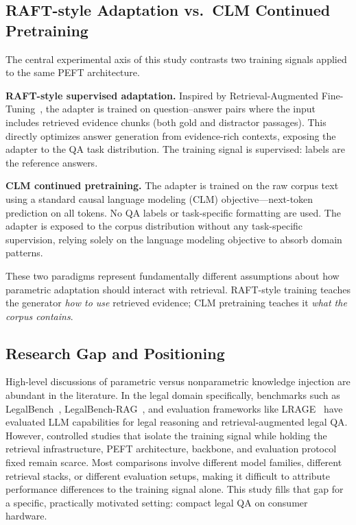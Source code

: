 \subsection{RAFT-style Adaptation vs.\ CLM Continued Pretraining}

The central experimental axis of this study contrasts two training signals applied to the same PEFT architecture.

\textbf{RAFT-style supervised adaptation.} Inspired by Retrieval-Augmented Fine-Tuning~\cite{zhang2024raft}, the adapter is trained on question--answer pairs where the input includes retrieved evidence chunks (both gold and distractor passages). This directly optimizes answer generation from evidence-rich contexts, exposing the adapter to the QA task distribution. The training signal is supervised: labels are the reference answers.

\textbf{CLM continued pretraining.} The adapter is trained on the raw corpus text using a standard causal language modeling (CLM) objective---next-token prediction on all tokens. No QA labels or task-specific formatting are used. The adapter is exposed to the corpus distribution without any task-specific supervision, relying solely on the language modeling objective to absorb domain patterns.

These two paradigms represent fundamentally different assumptions about how parametric adaptation should interact with retrieval. RAFT-style training teaches the generator \emph{how to use} retrieved evidence; CLM pretraining teaches it \emph{what the corpus contains}.

\subsection{Research Gap and Positioning}

High-level discussions of parametric versus nonparametric knowledge injection are abundant in the literature. In the legal domain specifically, benchmarks such as LegalBench~\cite{guha2023legalbench}, LegalBench-RAG~\cite{pipitone2024legalbenchrag}, and evaluation frameworks like LRAGE~\cite{park2025lrage} have evaluated LLM capabilities for legal reasoning and retrieval-augmented legal QA. However, controlled studies that isolate the training signal while holding the retrieval infrastructure, PEFT architecture, backbone, and evaluation protocol fixed remain scarce. Most comparisons involve different model families, different retrieval stacks, or different evaluation setups, making it difficult to attribute performance differences to the training signal alone. This study fills that gap for a specific, practically motivated setting: compact legal QA on consumer hardware.

